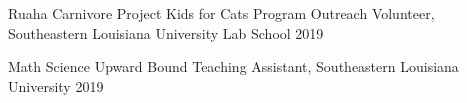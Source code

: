 

\begin{cvhonors}
  \cvhonor
    {Ruaha Carnivore Project Kids for Cats Program} %
    {Outreach Volunteer, Southeastern Louisiana University Lab School} %
    {} %
    {2019} %
    
  \cvhonor
    {Math Science Upward Bound} %
    {Teaching Assistant, Southeastern Louisiana University}
    {} %
    {2019} %
    
\end{cvhonors}


